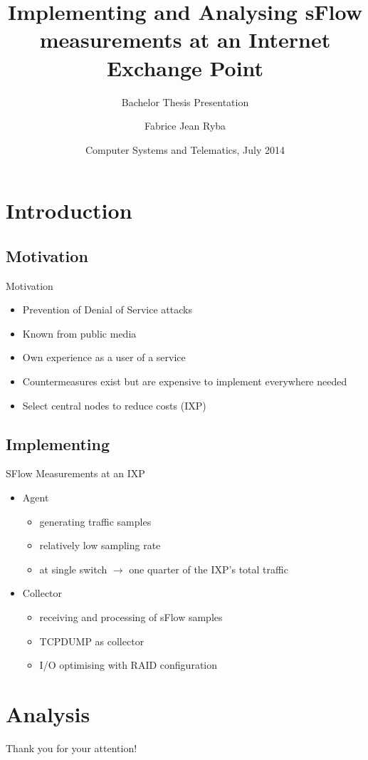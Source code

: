 \documentclass[9pt]{beamer}
\title{Implementing and Analysing sFlow measurements at an Internet Exchange Point}
\subtitle{Bachelor Thesis Presentation}
\author{Fabrice Jean Ryba}
\institute[FU Berlin]{Freie Universität Berlin}
\date[]{Computer Systems and Telematics, July 2014}
\begin{document}
    \begin{frame}
        \titlepage
    \end{frame}

\section{Introduction}

\subsection{Motivation}
    \begin{frame}{Motivation}
	\begin{itemize}
		\item Prevention of Denial of Service attacks
		\item Known from public media
		\item Own experience as a user of a service
		\item Countermeasures exist but are expensive to implement everywhere needed
		\item Select central nodes to reduce costs (IXP)
	\end{itemize}
    \end{frame}

\subsection{Implementing}

	\begin{frame}{SFlow Measurements at an IXP}
		\begin{itemize}
			\item Agent
			\begin{itemize}
				\item generating traffic samples
				\item relatively low sampling rate
				\item at single switch $\rightarrow$ one quarter of the IXP's total traffic
			\end{itemize}
			\item Collector
			\begin{itemize}
				\item receiving and processing of sFlow samples
				\item TCPDUMP as collector
				\item I/O optimising with RAID configuration
			\end{itemize}
		\end{itemize}
	\end{frame}

\section{Analysis}


    \begin{frame}
        \begin{center}
            \Large Thank you for your attention!
        \end{center}
    \end{frame}
\end{document}
